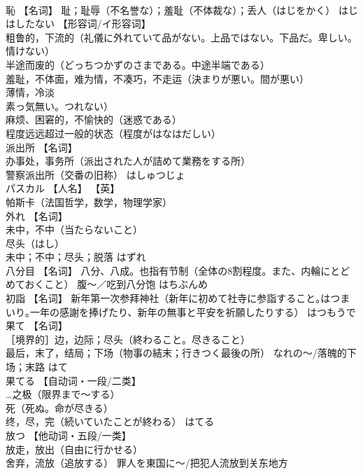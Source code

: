 \documentclass[8pt]{extreport}
\begin{document}
\begin{CJK}{UTF8}{min}
\\	恥	【名词】 耻；耻辱（不名誉な）；羞耻（不体裁な）；丢人（はじをかく）	はじ	
\\	はしたない	【形容词/イ形容词】 
\\	粗鲁的，下流的（礼儀に外れていて品がない。上品ではない。下品だ。卑しい。情けない） 
\\	半途而废的（どっちつかずのさまである。中途半端である） 
\\	羞耻，不体面，难为情，不凑巧，不走运（決まりが悪い。間が悪い） 
\\	薄情，冷淡
\\	素っ気無い。つれない） 
\\	麻烦、困窘的，不愉快的（迷惑である） 
\\	程度远远超过一般的状态（程度がはなはだしい）		
\\	派出所	【名词】 
\\	办事处，事务所（派出された人が詰めて業務をする所） 
\\	警察派出所（交番の旧称）	はしゅつじょ	
\\	パスカル	【人名】 【英】
\\	帕斯卡（法国哲学，数学，物理学家）		
\\	外れ	【名词】 
\\	未中，不中（当たらないこと） 
\\	尽头（はし） 
\\	未中；不中；尽头；脱落	はずれ	
\\	八分目	【名词】 八分、八成。也指有节制（全体の8割程度。また、内輪にとどめておくこと） 腹～／吃到八分饱	はちぶんめ	
\\	初詣	【名词】 新年第一次参拜神社（新年に初めて社寺に参詣すること｡はつまいり｡一年の感謝を捧げたり、新年の無事と平安を祈願したりする）	はつもうで	
\\	果て	【名词】 
\\	［境界的］边，边际；尽头（終わること。尽きること） 
\\	最后，末了，结局；下场（物事の結末；行きつく最後の所） なれの～/落魄的下场；末路	はて	
\\	果てる	【自动词・一段/二类】 
\\	…之极（限界まで～する） 
\\	死（死ぬ。命が尽きる） 
\\	终，尽，完（続いていたことが終わる）	はてる	
\\	放つ	【他动词・五段/一类】 
\\	放走，放出（自由に行かせる） 
\\	舍弃，流放（追放する） 罪人を東国に～/把犯人流放到关东地方 

\end{CJK}
\end{document}
